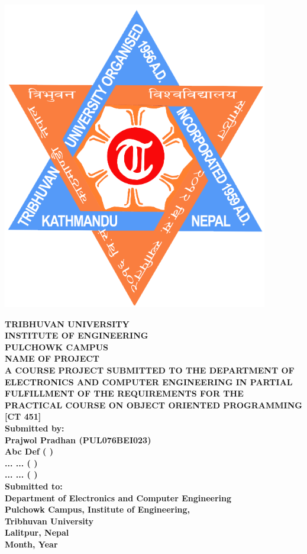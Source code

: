 \documentclass[main.tex]{subfiles}
\begin{document}
\begin{titlepage}
	\begin{center}

	\includegraphics[scale=0.2]{graphics/tu_logo.png}

\textbf{	TRIBHUVAN UNIVERSITY\\
	INSTITUTE OF ENGINEERING\\
	PULCHOWK CAMPUS}\\
	[2cm]

\textbf{	NAME OF PROJECT   }\\
	[2cm]

\textbf{	A COURSE PROJECT SUBMITTED TO THE DEPARTMENT OF ELECTRONICS AND COMPUTER ENGINEERING IN PARTIAL FULFILLMENT OF THE REQUIREMENTS FOR THE PRACTICAL COURSE ON OBJECT ORIENTED PROGRAMMING [CT 451]}\\
	[2cm]

\textbf{	Submitted by:\\
	Prajwol Pradhan (PUL076BEI023)\\
	Abc Def (   )\\
	... ... (   )\\
	... ... (   )}\\
	[1cm]

\textbf{Submitted to:\\
	Department of Electronics and Computer Engineering\\
	Pulchowk Campus, 	Institute of Engineering,\\ 
	Tribhuvan University\\
	Lalitpur, Nepal}\\
	[1.5cm]

\textbf{	Month, Year}

	\end{center}
\end{titlepage} 
\end{document}
